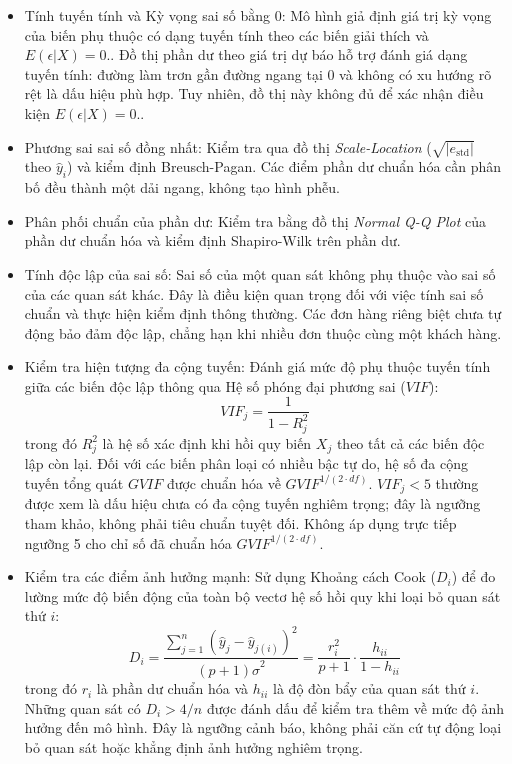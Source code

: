 	\begin{itemize}
		\item Tính tuyến tính và Kỳ vọng sai số bằng 0: Mô hình giả định giá trị kỳ vọng của biến phụ thuộc có dạng tuyến tính theo các biến giải thích và $E(\epsilon|X)=0.$. Đồ thị phần dư theo giá trị dự báo hỗ trợ đánh giá dạng tuyến tính: đường làm trơn gần đường ngang tại 0 và không có xu hướng rõ rệt là dấu hiệu phù hợp. Tuy nhiên, đồ thị này không đủ để xác nhận điều kiện $E(\epsilon|X)=0.$.
		\item Phương sai sai số đồng nhất: Kiểm tra qua đồ thị \textit{Scale-Location} ($\sqrt{\vert{}e_{\text{std}}\vert{}}$ theo $\hat{y}_i$) và kiểm định Breusch-Pagan. Các điểm phần dư chuẩn hóa cần phân bố đều thành một dải ngang, không tạo hình phễu.
		\item Phân phối chuẩn của phần dư: Kiểm tra bằng đồ thị \textit{Normal Q-Q Plot} của phần dư chuẩn hóa và kiểm định Shapiro-Wilk trên phần dư.
		\item Tính độc lập của sai số: Sai số của một quan sát không phụ thuộc vào sai số của các quan sát khác. Đây là điều kiện quan trọng đối với việc tính sai số chuẩn và thực hiện kiểm định thông thường. Các đơn hàng riêng biệt chưa tự động bảo đảm độc lập, chẳng hạn khi nhiều đơn thuộc cùng một khách hàng.
		\item Kiểm tra hiện tượng đa cộng tuyến: Đánh giá mức độ phụ thuộc tuyến tính giữa các biến độc lập thông qua Hệ số phóng đại phương sai ($VIF$):
		\begin{equation}
			VIF_j = \frac{1}{1 - R_j^2}
		\end{equation}
		trong đó $R_j^2$ là hệ số xác định khi hồi quy biến $X_j$ theo tất cả các biến độc lập còn lại. Đối với các biến phân loại có nhiều bậc tự do, hệ số đa cộng tuyến tổng quát $GVIF$ được chuẩn hóa về $GVIF^{1/(2\cdot df)}$. $VIF_j < 5$ thường được xem là dấu hiệu chưa có đa cộng tuyến nghiêm trọng; đây là ngưỡng tham khảo, không phải tiêu chuẩn tuyệt đối. Không áp dụng trực tiếp ngưỡng 5 cho chỉ số đã chuẩn hóa $GVIF^{1/(2\cdot df)}$. 
		\item Kiểm tra các điểm ảnh hưởng mạnh: Sử dụng Khoảng cách Cook ($D_i$) để đo lường mức độ biến động của toàn bộ vectơ hệ số hồi quy khi loại bỏ quan sát thứ $i$:
		\begin{equation}
			D_i = \frac{\sum_{j=1}^{n} \left(\hat{y}_j - \hat{y}_{j(i)}\right)^2}{(p + 1)\hat{\sigma}^2} = \frac{r_i^2}{p + 1} \cdot \frac{h_{ii}}{1 - h_{ii}}
		\end{equation}
		trong đó $r_i$ là phần dư chuẩn hóa và $h_{ii}$ là độ đòn bẩy của quan sát thứ $i$. Những quan sát có $D_i > 4/n$ được đánh dấu để kiểm tra thêm về mức độ ảnh hưởng đến mô hình. Đây là ngưỡng cảnh báo, không phải căn cứ tự động loại bỏ quan sát hoặc khẳng định ảnh hưởng nghiêm trọng.
	\end{itemize}
	
